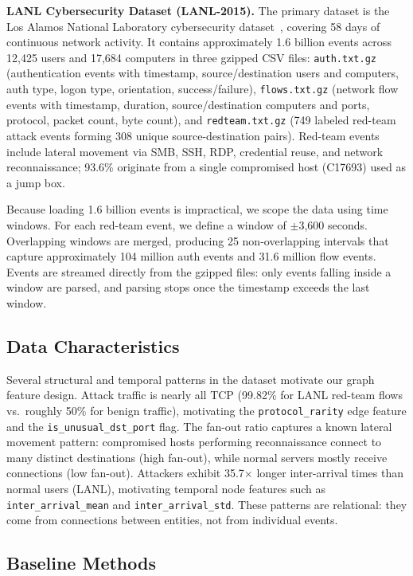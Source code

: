 \documentclass[letterpaper,twocolumn,10pt]{article}
\begin{document}
\textbf{LANL Cybersecurity Dataset (LANL-2015).}
The primary dataset is the Los Alamos National Laboratory cybersecurity dataset~\cite{kent-2015-cyberdata1}, covering 58 days of continuous network activity. It contains approximately 1.6 billion events across 12,425 users and 17,684 computers in three gzipped CSV files: \texttt{auth.txt.gz} (authentication events with timestamp, source/destination users and computers, auth type, logon type, orientation, success/failure), \texttt{flows.txt.gz} (network flow events with timestamp, duration, source/destination computers and ports, protocol, packet count, byte count), and \texttt{redteam.txt.gz} (749 labeled red-team attack events forming 308 unique source-destination pairs). Red-team events include lateral movement via SMB, SSH, RDP, credential reuse, and network reconnaissance; 93.6\% originate from a single compromised host (C17693) used as a jump box.

Because loading 1.6 billion events is impractical, we scope the data using time windows. For each red-team event, we define a window of $\pm$3,600 seconds. Overlapping windows are merged, producing 25 non-overlapping intervals that capture approximately 104 million auth events and 31.6 million flow events. Events are streamed directly from the gzipped files: only events falling inside a window are parsed, and parsing stops once the timestamp exceeds the last window.

\subsection{Data Characteristics}

Several structural and temporal patterns in the dataset motivate our graph feature design. Attack traffic is nearly all TCP (99.82\% for LANL red-team flows vs.\ roughly 50\% for benign traffic), motivating the \texttt{protocol\_rarity} edge feature and the \texttt{is\_unusual\_dst\_port} flag. The fan-out ratio captures a known lateral movement pattern: compromised hosts performing reconnaissance connect to many distinct destinations (high fan-out), while normal servers mostly receive connections (low fan-out). Attackers exhibit 35.7$\times$ longer inter-arrival times than normal users (LANL), motivating temporal node features such as \texttt{inter\_arrival\_mean} and \texttt{inter\_arrival\_std}. These patterns are relational: they come from connections between entities, not from individual events.

\subsection{Baseline Methods}
\end{document}
